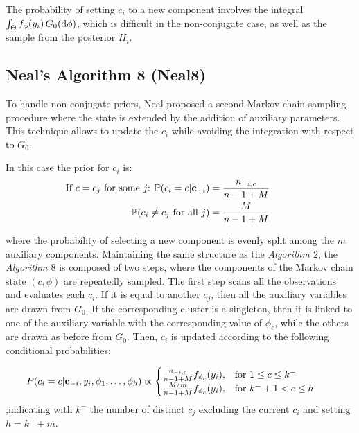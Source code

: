 The probability of setting $c_i$ to a new component involves the integral $\int_{\Theta} f_{\phi}(y_{i}) \, G_0(\mathrm d\phi)$, which is difficult in the non-conjugate case, as well as the sample from the posterior $H_i$.

\subsection{Neal's Algorithm 8 (Neal8)}
To handle non-conjugate priors, Neal proposed a second Markov chain sampling procedure where the state is extended by the addition of auxiliary parameters.
This technique allows to update the $c_i$ while avoiding the integration with respect to $G_0$.
 
In this case the prior for $c_i$ is:
\begin{align}
            \hspace{-25pt}
            \vspace{-12pt}
                \text{If $c=c_j$ for some $j$: } \PP(c_i=c | \mathbf c_{-i}) &= \frac{n_{-i,c}}{n-1+M}   \\
                \PP(c_{i}\neq c_{j} \text{ for all } j) &=\frac{M }{n-1+M}                  \nonumber
\end{align}
            
            	
where the probability of selecting a new component is evenly split among the $m$ auxiliary components.
Maintaining the same structure as the \textit{Algorithm $2$}, the \textit{Algorithm $8$} is composed of two steps, where the components of the Markov chain state $(c,\phi)$ are repeatedly sampled. The first step scans all the observations and evaluates each $c_i$. If it is equal to another $c_j$, then all the auxiliary variables are drawn from $G_0$. If the corresponding cluster is a singleton, then it is linked to one of the auxiliary variable with the corresponding value of $\phi_c$, while the others are drawn as before from $G_0$. Then, $c_i$ is updated according to the following conditional probabilities:

\begin{displaymath}
		            	\hspace{-20pt}
		            	P(c_{i}=c | \mathbf c_{-i}, y_{i}, \phi_{1},\dots,\phi_{h}) \propto \begin{cases}  \frac{n_{-i,c}}{n-1+M}f_{\phi_{c}}(y_{i}), & \mbox{for } 1 \leq c \leq k^{-} \\ \frac{M/m}{n-1+M}f_{\phi_{c}}(y_{i}), & \mbox{for } k^{-}+1 < c \leq h
		            	\end{cases}
		            	\vspace{-5pt}
\end{displaymath}
,indicating with $k^{-}$ the number of distinct $c_j$ excluding the current $c_i$ and setting $h=k^{-}+m$.

